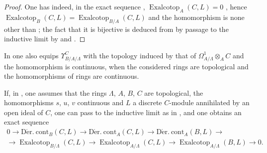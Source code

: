 \begin{proof}
One has indeed, in the exact sequence , $\operatorname{Exalcotop}_A(C,L)=0$ , hence $\operatorname{Exalcotop}_B(C,L)=\operatorname{Exalcotop}_{B/A}(C,L)$ and the homomorphism  is none other than ; the fact that it is bijective is deduced from  by passage to the inductive limit by  and .
\end{proof}

\begin{env}[20.7.12]
\label{0.20.7.12}
In  one also equips $\Upsilon^C_{B/A/\Lambda}$ with the topology induced by that of $\Omega^1_{A/\Lambda}\otimes_A C$ and the homomorphism  is continuous, when the considered rings are topological and the homomorphisms of rings are continuous.
\end{env}

\begin{env}[20.7.13]
\label{0.20.7.13}
If, in , one assumes that the rings $\Lambda$, $A$, $B$, $C$ are topological, the homomorphisms $s$, $u$, $v$ continuous and $L$ a discrete $C$-module annihilated by an open ideal of $C$, one can pass to the inductive limit as in , and one obtains an exact sequence
\begin{equation}
\tag{20.7.13.1}
  \label{0.20.7.13.1}
\begin{split}
  0\to\operatorname{D\acute{e}r.\ cont}_B(C,L)\to\operatorname{D\acute{e}r.\ cont}_A(C,L)\to\operatorname{D\acute{e}r.\ cont}_A(B,L)\to \\
  \to\operatorname{Exalcotop}_{B/\Lambda}(C,L)\to\operatorname{Exalcotop}_{A/\Lambda}(C,L)\to\operatorname{Exalcotop}_{A/\Lambda}(B,L)\to 0.
\end{split}
\end{equation}
\end{env}

